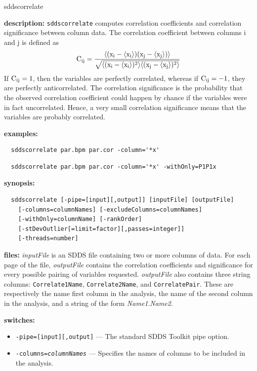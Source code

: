 \begin{sddsprog}{sddscorrelate}
\item \textbf{description:}
  {\tt sddscorrelate} computes correlation coefficients and correlation
  significance between column data. The correlation coefficient between
  columns i and j is defined as
  \[ {\rm C_{ij} = \frac{\langle (x_i-\langle x_i \rangle) (x_j-\langle x_j \rangle)\rangle}
  {\sqrt{\langle (x_i-\langle x_i \rangle)^2\rangle \langle (x_j - \langle x_j \rangle)^2 \rangle}}} \]
  If ${\rm C_{ij}=1}$, then the variables are perfectly correlated, whereas if ${\rm C_{ij}=-1}$,
  they are perfectly anticorrelated. The correlation significance is the probability that the
  observed correlation coefficient could happen by chance if the variables were in fact
  uncorrelated. Hence, a very small correlation significance means that the variables are
  probably correlated.
\item \textbf{examples:}
\begin{verbatim}
  sddscorrelate par.bpm par.cor -column='*x'
\end{verbatim}
\begin{verbatim}
  sddscorrelate par.bpm par.cor -column='*x' -withOnly=P1P1x
\end{verbatim}
\item \textbf{synopsis:}
\begin{verbatim}
  sddscorrelate [-pipe=[input][,output]] [inputFile] [outputFile]
    [-columns=columnNames] [-excludeColumns=columnNames]
    [-withOnly=columnName] [-rankOrder]
    [-stDevOutlier[=limit=factor][,passes=integer]]
    [-threads=number]
\end{verbatim}
\item \textbf{files:}
  {\em inputFile} is an SDDS file containing two or more columns of data. For each page of
  the file, {\em outputFile} contains the correlation coefficients and significance for
  every possible pairing of variables requested. {\em outputFile} also contains three string
  columns: {\tt Correlate1Name}, {\tt Correlate2Name}, and {\tt CorrelatePair}. These are
  respectively the name first column in the analysis, the name of the second column in
  the analysis, and a string of the form {\em Name1}.{\em Name2}.
\item \textbf{switches:}
  \begin{itemize}
  \item {\tt -pipe=[input][,output]} --- The standard SDDS Toolkit pipe option.
  \item {\tt -columns={\em columnNames}} --- Specifies the names of columns to be included in the analysis.

\end{itemize}
\end{sddsprog}
